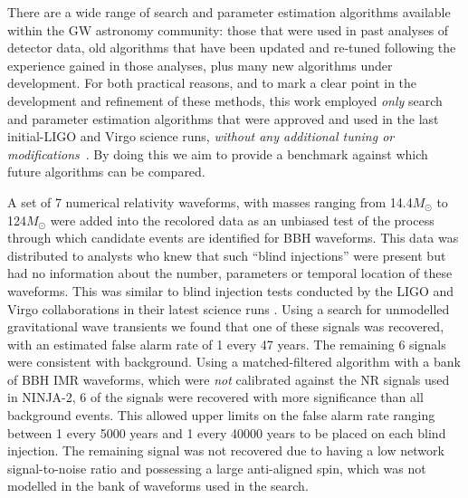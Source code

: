 There are a wide range of search and parameter estimation algorithms available
within the GW astronomy community: those that were used in past analyses of
detector data, old algorithms that have been updated and re-tuned following the
experience gained in those analyses, plus many new algorithms under
development. For both practical reasons, and to mark a clear point in the
development and refinement of these methods, this work employed \emph{only}
search and parameter estimation algorithms that were approved and used in the
last initial-LIGO and Virgo science runs, \emph{without any additional tuning
or 
modifications}~\cite{Klimenko:2008fu,Babak:2012zx,Aasi:2012rja,
Abadie:2012rq}. By doing this we aim to provide a benchmark against which
future algorithms can be compared.

A set of 7 numerical relativity waveforms, with
masses ranging from 14.4$M_{\odot}$ to 124$M_{\odot}$ were added into
the recolored data as an unbiased test of the process through which candidate 
events are identified for BBH waveforms. This 
data was distributed to analysts who
knew that such ``blind injections'' were present but had no
information about the number, parameters or temporal location of these
waveforms. This was similar to blind injection tests conducted by the
LIGO and Virgo collaborations in their latest science runs
\cite{Colaboration:2011np}. Using a search for unmodelled gravitational wave 
transients we found that one of these signals was recovered, with an estimated 
false alarm rate of 1 every 47 years. The
remaining 6 signals were consistent with background. Using a
matched-filtered algorithm with a bank of BBH IMR waveforms, which were 
\emph{not} calibrated against the NR signals used in NINJA-2, 6 of the
signals were recovered with more significance than all background
events. This allowed upper limits on the false alarm rate ranging
between 1 every 5000 years and 1 every 40000 years to be placed on
each blind injection. The remaining signal was not recovered due to
having a low network signal-to-noise ratio and possessing a large
anti-aligned spin, which was not modelled in the bank of waveforms used in the 
search.


